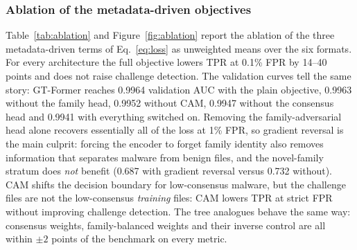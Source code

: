 \documentclass[fleqn,10pt]{wlscirep}
\newcommand{\gtf}{GT\mbox{-}Former}
\begin{document}
\subsubsection{Ablation of the metadata-driven objectives}
\label{sec:ablation}
Table~\ref{tab:ablation} and Figure~\ref{fig:ablation} report the ablation of the three metadata-driven terms of Eq.~\eqref{eq:loss} as unweighted means over the six formats. For every architecture the full objective lowers TPR at 0.1\% FPR by 14--40 points and does not raise challenge detection. The validation curves tell the same story: \gtf{} reaches 0.9964 validation AUC with the plain objective, 0.9963 without the family head, 0.9952 without CAM, 0.9947 without the consensus head and 0.9941 with everything switched on. Removing the family-adversarial head alone recovers essentially all of the loss at 1\% FPR, so gradient reversal is the main culprit: forcing the encoder to forget family identity also removes information that separates malware from benign files, and the novel-family stratum does \emph{not} benefit (0.687 with gradient reversal versus 0.732 without). CAM shifts the decision boundary for low-consensus malware, but the challenge files are not the low-consensus \emph{training} files: CAM lowers TPR at strict FPR without improving challenge detection. The tree analogues behave the same way: consensus weights, family-balanced weights and their inverse control are all within $\pm 2$ points of the benchmark on every metric.
\end{document}
